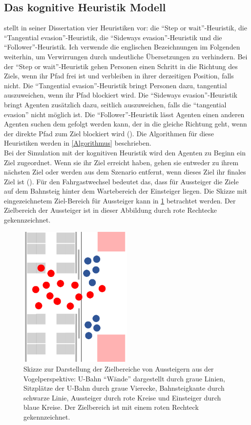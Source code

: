 \subsection{Das kognitive Heuristik Modell} \label{CHM}
\cite{Seitz.2016} stellt in seiner Dissertation vier Heuristiken vor: die "`Step or wait"'-Heuristik, die "`Tangential evasion"'-Heuristik, die "`Sideways evasion"'-Heuristik und die "`Follower"'-Heuristik. Ich verwende die englischen Bezeichnungen im Folgenden weiterhin, um Verwirrungen durch undeutliche Übersetzungen zu verhindern. Bei der "`Step or wait"'-Heuristik gehen Personen einen Schritt in die Richtung des Ziels, wenn ihr Pfad frei ist und verbleiben in ihrer derzeitigen Position, falls nicht. Die "`Tangential evasion"'-Heuristik bringt Personen dazu, tangential auszuweichen, wenn ihr Pfad blockiert wird. Die "`Sideways evasion"'-Heuristik bringt Agenten zusätzlich dazu, seitlich auszuweichen, falls die "`tangential evasion"' nicht möglich ist. Die "`Follower"'-Heuristik lässt Agenten einen anderen Agenten suchen dem gefolgt werden kann, der in die gleiche Richtung geht, wenn der direkte Pfad zum Ziel blockiert wird (\cite{Seitz.2016}). Die Algorithmen für diese Heuristiken werden in \ref{Algorithmus} beschrieben. \\
Bei der Simulation mit der kognitiven Heuristik wird den Agenten zu Beginn ein Ziel zugeordnet. Wenn sie ihr Ziel erreicht haben, gehen sie entweder zu ihrem nächsten Ziel oder werden aus dem Szenario entfernt, wenn dieses Ziel ihr finales Ziel ist (\cite{Seitz.2016}). Für den Fahrgastwechsel bedeutet das, dass für Aussteiger die Ziele auf dem Bahnsteig hinter dem Wartebereich der Einsteiger liegen.
Die Skizze mit eingezeichnetem Ziel-Bereich für Aussteiger kann in \figurename \ref{fig:SkizzeAussteiger} betrachtet werden. Der Zielbereich der Aussteiger ist in dieser Abbildung durch rote Rechtecke gekennzeichnet.
\begin{figure}[H]
	\centering
		\includegraphics[angle=270, width=0.5\textwidth]{pictures/model/kognitive_heuristic_model/alight_sketch.png}
	\caption{Skizze zur Darstellung der Zielbereiche von Aussteigern aus der Vogelperspektive: U-Bahn "`Wände"' dargestellt durch graue Linien, Sitzplätze der U-Bahn durch graue Vierecke, Bahnsteigkante durch schwarze Linie, Aussteiger durch rote Kreise und Einsteiger durch blaue Kreise. Der Zielbereich ist mit einem roten Rechteck gekennzeichnet.}
	\label{fig:SkizzeAussteiger}
\end{figure}
